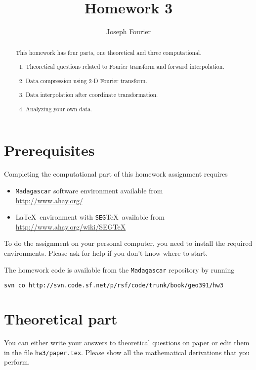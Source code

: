 \author{Joseph Fourier}
\title{Homework 3}

\begin{abstract}
  This homework has four parts, one theoretical and three computational. 
  \begin{enumerate}
  \item Theoretical questions related to Fourier transform and forward interpolation.
  \item Data compression using 2-D Fourier transform.
  \item Data interpolation after coordinate transformation.
  \item Analyzing your own data.
  \end{enumerate}
\end{abstract}

\section{Prerequisites}

Completing the computational part of this homework assignment requires
\begin{itemize}
\item \texttt{Madagascar} software environment available from \\
\url{http://www.ahay.org/}
\item \LaTeX\ environment with \texttt{SEG}\TeX\ available from \\ 
\url{http://www.ahay.org/wiki/SEGTeX}
\end{itemize}
To do the assignment on your personal computer, you need to install
the required environments. Please ask for help if you don't know where
to start.

The homework code is available from the \texttt{Madagascar} repository
by running
\begin{verbatim}
svn co http://svn.code.sf.net/p/rsf/code/trunk/book/geo391/hw3
\end{verbatim}

\section{Theoretical part}

You can either write your answers to theoretical questions on paper or
edit them in the file \texttt{hw3/paper.tex}. Please show all the
mathematical derivations that you perform.

